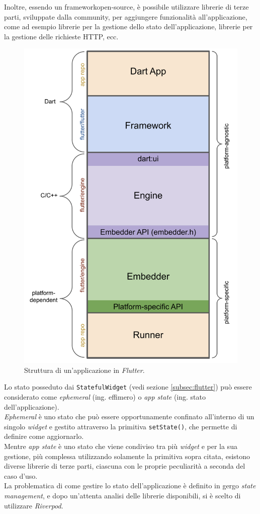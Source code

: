 Inoltre, essendo un \gls{framework}\glsoccur \gls{open-source}\glsoccur, è possibile utilizzare librerie di terze parti, sviluppate dalla community, per aggiungere funzionalità all'applicazione, come ad esempio librerie per la gestione dello stato dell'applicazione, librerie per la gestione delle richieste HTTP, ecc.

\begin{figure}[!h] 
    \centering 
    \includegraphics[width=0.4\columnwidth]{images/flutter-app-anatomy.png} 
    \caption{Struttura di un'applicazione in \emph{Flutter}.}
    \label{fig:architettura-flutter}
\end{figure}

Lo stato posseduto dai \lstinline{StatefulWidget} (vedi sezione \ref{subsec:flutter}) può essere considerato come \emph{ephemeral} (ing. effimero) o \emph{app state} (ing. stato dell'applicazione). \\
\emph{Ephemeral} è uno stato che può essere opportunamente confinato all'interno di un singolo \emph{widget} e gestito attraverso la primitiva \lstinline{setState()}, che permette di definire come aggiornarlo.\\
Mentre \emph{app state} è uno stato che viene condiviso tra più \emph{widget} e per la sua gestione, più complessa utilizzando solamente la primitiva sopra citata, esistono diverse librerie di terze parti, ciascuna con le proprie peculiarità a seconda del caso d'uso.\\
\indent La problematica di come gestire lo stato dell'applicazione è definito in gergo \emph{state management}\cite{site:flutter-state-mgmt}, e dopo un'attenta analisi delle librerie disponibili, si è scelto di utilizzare \emph{Riverpod}\cite{site:riverpod}.

\newpage


